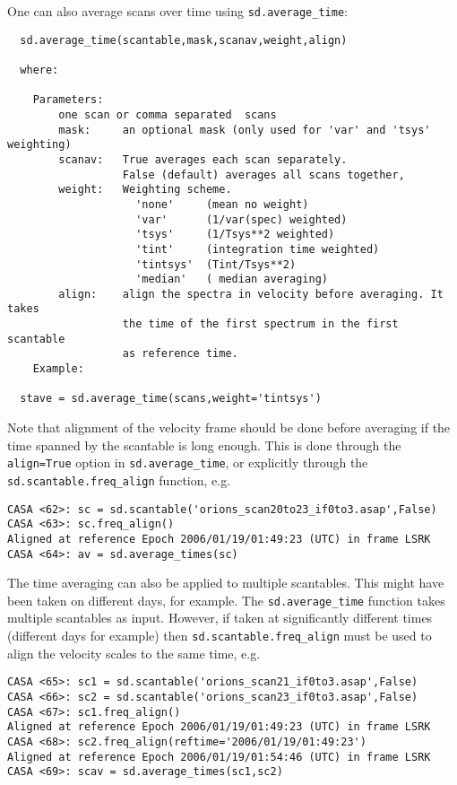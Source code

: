 One can also average scans over time using {\tt sd.average\_time}:
\small
\begin{verbatim}
  sd.average_time(scantable,mask,scanav,weight,align)

  where:

    Parameters:
        one scan or comma separated  scans
        mask:     an optional mask (only used for 'var' and 'tsys' weighting)
        scanav:   True averages each scan separately.
                  False (default) averages all scans together,
        weight:   Weighting scheme.
                    'none'     (mean no weight)
                    'var'      (1/var(spec) weighted)
                    'tsys'     (1/Tsys**2 weighted)
                    'tint'     (integration time weighted)
                    'tintsys'  (Tint/Tsys**2)
                    'median'   ( median averaging)
        align:    align the spectra in velocity before averaging. It takes
                  the time of the first spectrum in the first scantable
                  as reference time.
    Example:
  
  stave = sd.average_time(scans,weight='tintsys')
\end{verbatim}
\normalsize

Note that alignment of the velocity frame should be done before
averaging if the time spanned by the scantable is 
long enough.  This is done through the {\tt align=True} option in
{\tt sd.average\_time}, or explicitly through the
{\tt sd.scantable.freq\_align} function, e.g.
\small
\begin{verbatim}
CASA <62>: sc = sd.scantable('orions_scan20to23_if0to3.asap',False)
CASA <63>: sc.freq_align()
Aligned at reference Epoch 2006/01/19/01:49:23 (UTC) in frame LSRK
CASA <64>: av = sd.average_times(sc)
\end{verbatim}
\normalsize

The time averaging can also be applied to multiple scantables.  This
might have been taken on different days, for example.  The
{\tt sd.average\_time} function takes multiple scantables as input.
However, if taken at significantly different times (different days for
example) then {\tt sd.scantable.freq\_align} must be used to align
the velocity scales to the same time, e.g.
\small
\begin{verbatim}
CASA <65>: sc1 = sd.scantable('orions_scan21_if0to3.asap',False)
CASA <66>: sc2 = sd.scantable('orions_scan23_if0to3.asap',False)
CASA <67>: sc1.freq_align()
Aligned at reference Epoch 2006/01/19/01:49:23 (UTC) in frame LSRK
CASA <68>: sc2.freq_align(reftime='2006/01/19/01:49:23')
Aligned at reference Epoch 2006/01/19/01:54:46 (UTC) in frame LSRK
CASA <69>: scav = sd.average_times(sc1,sc2)
\end{verbatim}
\normalsize

